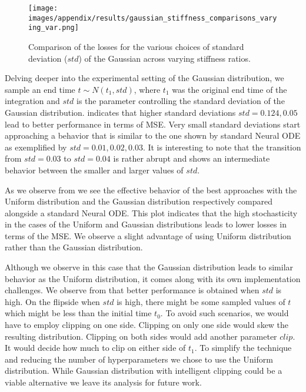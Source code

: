 \begin{wrapfigure}[14]{r}{0.4\textwidth}
	\vspace{-0.4in}
	\centering
	\texttt{[image: images/appendix/results/gaussian\_stiffness\_comparisons\_varying\_var.png]}
	\caption{Comparison of the losses for the various choices of standard deviation ($std$) of the Gaussian across varying stiffness ratios.} 
	\label{fig:gaussian_stiffness_comparisons_var_varying}
\end{wrapfigure}


Delving deeper into the experimental setting of the Gaussian distribution, we sample an end time $t \sim N(t_1,std)$, where $t_1$ was the original end time of the integration and $std$ is the parameter controlling the standard deviation of the Gaussian distribution.  indicates that higher standard deviations $std=0.124,0.05$ lead to better performance in terms of MSE. Very small standard deviations start approaching a behavior that is similar to the one shown by standard Neural ODE as exemplified by $std=0.01,0.02,0.03$. It is interesting to note that the transition from $std=0.03$ to $std=0.04$ is rather abrupt and shows an intermediate behavior between the smaller and larger values of $std$.




As we observe from  we see the effective behavior of the best approaches with the Uniform distribution and the Gaussian distribution respectively compared alongside a standard Neural ODE. This plot indicates that the high stochasticity in the cases of the Uniform and Gaussian distributions leads to lower losses in terms of the MSE. We observe a slight advantage of using Uniform distribution rather than the Gaussian distribution.



Although we observe in this case that the Gaussian distribution leads to similar behavior as the Uniform distribution, it comes along with its own implementation challenges. We observe from  that better performance is obtained when $std$ is high. On the flipside when $std$ is high, there might be some sampled values of $t$ which might be less than the initial time $t_0$. To avoid such scenarios, we would have to employ clipping on one side. Clipping on only one side would skew the resulting distribution. Clipping on both sides would add another parameter $clip$. It would decide how much to clip on either side of $t_1$. To simplify the technique and reducing the number of hyperparameters we chose to use the Uniform distribution. While Gaussian distribution with intelligent clipping could be a viable alternative we leave its analysis for future work. 



